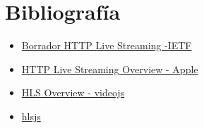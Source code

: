\section{Bibliografía}\label{bibliografuxeda}

\begin{itemize}
\tightlist
\item
  \href{https://datatracker.ietf.org/doc/draft-pantos-http-live-streaming/}{Borrador
  HTTP Live Streaming -IETF}
\item
  \href{https://developer.apple.com/library/content/documentation/NetworkingInternet/Conceptual/StreamingMediaGuide/Introduction/Introduction.html}{HTTP
  Live Streaming Overview - Apple}
\item
  \href{https://github.com/videojs/videojs-contrib-hls/blob/v3.6.6/docs/arch.md}{HLS
  Overview - videojs}
\item
  \href{https://github.com/dailymotion/hls.js}{hlsjs}
\end{itemize}
